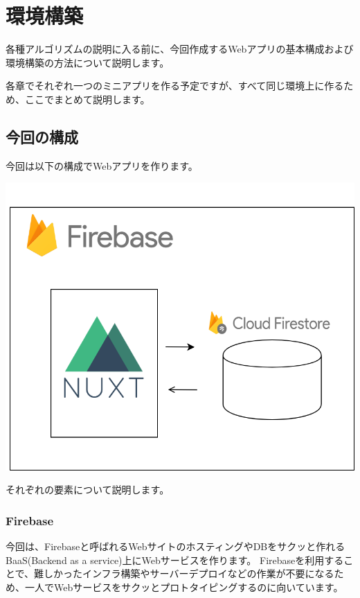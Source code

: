 \chapter{環境構築}
\label{chap:chap01-install}

各種アルゴリズムの説明に入る前に、今回作成するWebアプリの基本構成および環境構築の方法について説明します。

各章でそれぞれ一つのミニアプリを作る予定ですが、すべて同じ環境上に作るため、ここでまとめて説明します。

\section{今回の構成}
\label{sec:1-1}

今回は以下の構成でWebアプリを作ります。

\begin{reviewimage}%
\includegraphics[width=\maxwidth]{./images/architecture.png}%
\label{image:chap01-install:architecture}
\end{reviewimage}

それぞれの要素について説明します。

\subsection*{Firebase}
\label{sec:1-1-1}

今回は、Firebaseと呼ばれるWebサイトのホスティングやDBをサクッと作れるBaaS(Backend as a service)上にWebサービスを作ります。
Firebaseを利用することで、難しかったインフラ構築やサーバーデプロイなどの作業が不要になるため、一人でWebサービスをサクッとプロトタイピングするのに向いています。

